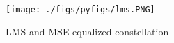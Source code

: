 \begin{figure}[!ht]
\centering
\texttt{[image: ./figs/pyfigs/lms.PNG]}
\caption{LMS and MSE equalized constellation}
\label{fig:lms_mse}
\end{figure}
